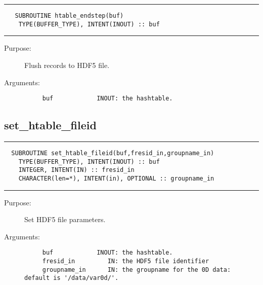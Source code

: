 \documentclass[a4paper]{article}
\begin{document}
\par
\addvspace{\medskipamount}
\nopagebreak\hrule
\begin{verbatim}
   SUBROUTINE htable_endstep(buf)
    TYPE(BUFFER_TYPE), INTENT(INOUT) :: buf
\end{verbatim}
\nopagebreak\hrule
\addvspace{\medskipamount}

\begin{description}
\item[Purpose:] \mbox{}

Flush records to HDF5 file.

\item[Arguments:] \mbox{}

\begin{verbatim}
     buf            INOUT: the hashtable.

\end{verbatim}


\end{description}





\subsection{set\_htable\_fileid}

\par
\addvspace{\medskipamount}
\nopagebreak\hrule
\begin{verbatim}
  SUBROUTINE set_htable_fileid(buf,fresid_in,groupname_in)
    TYPE(BUFFER_TYPE), INTENT(INOUT) :: buf
    INTEGER, INTENT(IN) :: fresid_in
    CHARACTER(len=*), INTENT(in), OPTIONAL :: groupname_in
\end{verbatim}
\nopagebreak\hrule
\addvspace{\medskipamount}

\begin{description}
\item[Purpose:] \mbox{}

Set HDF5 file parameters.

\item[Arguments:] \mbox{}

\begin{verbatim}
     buf            INOUT: the hashtable.
     fresid_in         IN: the HDF5 file identifier
     groupname_in      IN: the groupname for the 0D data: default is '/data/var0d/'.

\end{verbatim}


\end{description}
\end{document}
